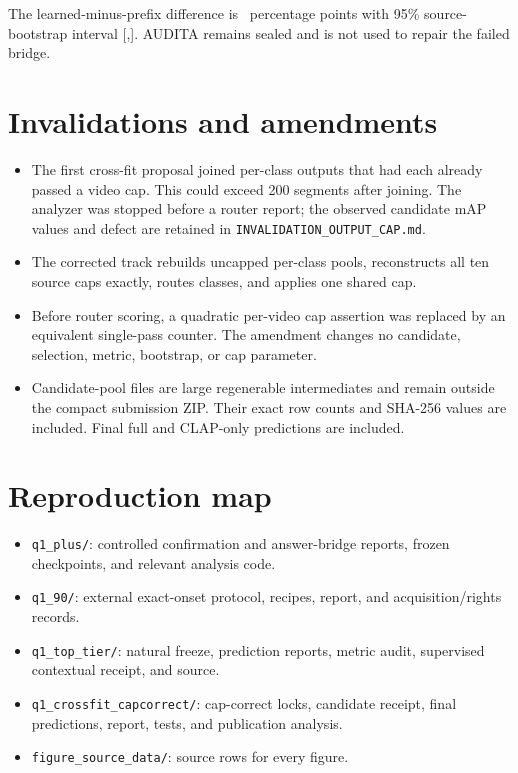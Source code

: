\documentclass[journal,10pt]{IEEEtran}
\begin{document}
The learned-minus-prefix difference is \AnswerVsStrongestPoints\ percentage
points with 95\% source-bootstrap interval
[\AnswerVsStrongestLowerPoints,\AnswerVsStrongestUpperPoints]. AUDITA remains
sealed and is not used to repair the failed bridge.

\section{Invalidations and amendments}
\begin{itemize}
  \item The first cross-fit proposal joined per-class outputs that had each
  already passed a video cap. This could exceed 200 segments after joining.
  The analyzer was stopped before a router report; the observed candidate
  mAP values and defect are retained in
  \texttt{INVALIDATION\_OUTPUT\_CAP.md}.
  \item The corrected track rebuilds uncapped per-class pools, reconstructs
  all ten source caps exactly, routes classes, and applies one shared cap.
  \item Before router scoring, a quadratic per-video cap assertion was
  replaced by an equivalent single-pass counter. The amendment changes no
  candidate, selection, metric, bootstrap, or cap parameter.
  \item Candidate-pool files are large regenerable intermediates and remain
  outside the compact submission ZIP. Their exact row counts and SHA-256
  values are included. Final full and CLAP-only predictions are included.
\end{itemize}

\section{Reproduction map}
\begin{itemize}
  \item \texttt{q1\_plus/}: controlled confirmation and answer-bridge
  reports, frozen checkpoints, and relevant analysis code.
  \item \texttt{q1\_90/}: external exact-onset protocol, recipes, report, and
  acquisition/rights records.
  \item \texttt{q1\_top\_tier/}: natural freeze, prediction reports, metric
  audit, supervised contextual receipt, and source.
  \item \texttt{q1\_crossfit\_capcorrect/}: cap-correct locks, candidate
  receipt, final predictions, report, tests, and publication analysis.
  \item \texttt{figure\_source\_data/}: source rows for every figure.
\end{itemize}
\end{document}
